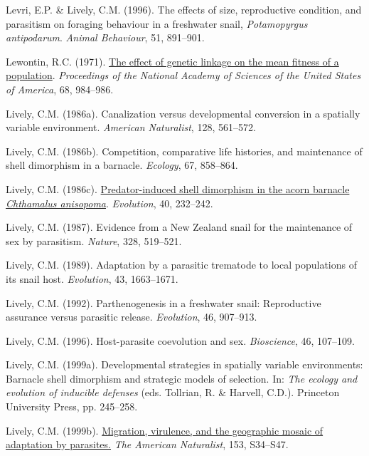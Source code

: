 \documentclass[
  letterpaper,
]{book}
\newlength{\cslhangindent}
\newenvironment{CSLReferences}[2] %
 {\begin{list}{}{%
  \setlength{\itemindent}{0pt}
  \setlength{\leftmargin}{0pt}
  \setlength{\parsep}{0pt}
  \ifodd #1
   \setlength{\leftmargin}{\cslhangindent}
   \setlength{\itemindent}{-1\cslhangindent}
  \fi
  \setlength{\itemsep}{#2\baselineskip}}}
 {\end{list}}
\begin{document}
\begin{CSLReferences}{1}{0}
Levri, E.P. \& Lively, C.M. (1996). The effects of size, reproductive
condition, and parasitism on foraging behaviour in a freshwater snail,
\emph{{P}otamopyrgus antipodarum}. \emph{Animal Behaviour}, 51,
891--901.

Lewontin, R.C. (1971). \href{https://doi.org/10.1073/pnas.68.5.984}{The
effect of genetic linkage on the mean fitness of a population}.
\emph{Proceedings of the National Academy of Sciences of the United
States of America}, 68, 984--986.

Lively, C.M. (1986a). Canalization versus developmental conversion in a
spatially variable environment. \emph{American Naturalist}, 128,
561--572.

Lively, C.M. (1986b). Competition, comparative life histories, and
maintenance of shell dimorphism in a barnacle. \emph{Ecology}, 67,
858--864.

Lively, C.M. (1986c).
\href{https://doi.org/10.1111/j.1558-5646.1986.tb00466.x}{Predator-induced
shell dimorphism in the acorn barnacle \emph{{C}hthamalus anisopoma}}.
\emph{Evolution}, 40, 232--242.

Lively, C.M. (1987). Evidence from a {New Zealand} snail for the
maintenance of sex by parasitism. \emph{Nature}, 328, 519--521.

Lively, C.M. (1989). Adaptation by a parasitic trematode to local
populations of its snail host. \emph{Evolution}, 43, 1663--1671.

Lively, C.M. (1992). Parthenogenesis in a freshwater snail: Reproductive
assurance versus parasitic release. \emph{Evolution}, 46, 907--913.

Lively, C.M. (1996). Host-parasite coevolution and sex.
\emph{Bioscience}, 46, 107--109.

Lively, C.M. (1999a). Developmental strategies in spatially variable
environments: Barnacle shell dimorphism and strategic models of
selection. In: \emph{The ecology and evolution of inducible defenses}
(eds. Tollrian, R. \& Harvell, C.D.). Princeton University Press, pp.
245--258.

Lively, C.M. (1999b). \href{https://doi.org/10.1086/303210}{Migration,
virulence, and the geographic mosaic of adaptation by parasites.}
\emph{The American Naturalist}, 153, S34--S47.


\end{CSLReferences}
\end{document}
